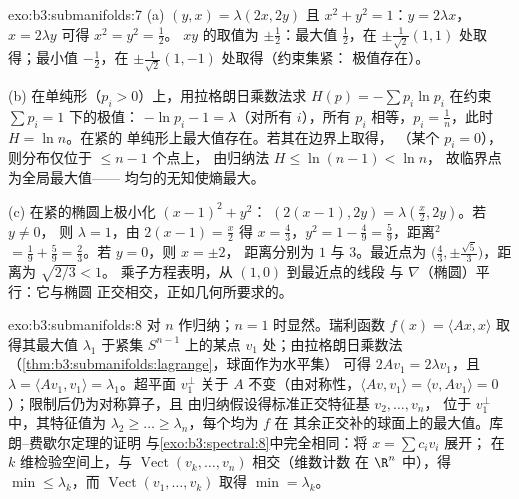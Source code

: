 \begin{solution}{exo:b3:submanifolds:7}
(a) $(y, x) = \lambda(2x, 2y)$ 且 $x^2 + y^2 = 1$：$y =
2\lambda x$，$x = 2\lambda y$ 可得 $x^2 = y^2 = \frac12$。
$xy$ 的取值为 $\pm\frac12$：最大值 $\frac12$，在
$\pm\frac1{\sqrt2}(1,1)$ 处取得；最小值 $-\frac12$，在
$\pm\frac1{\sqrt2}(1,-1)$ 处取得（约束集紧：
极值存在）。

(b) 在单纯形（$p_i > 0$）上，用拉格朗日乘数法求
$H(p) = -\sum p_i\ln p_i$ 在约束 $\sum p_i = 1$ 下的极值：
$-\ln p_i - 1 = \lambda$（对所有 $i$），所有 $p_i$ 相等，$p_i =
\frac1n$，此时 $H = \ln n$。在紧的
单纯形上最大值存在。若其在边界上取得，
（某个 $p_i = 0$），则分布仅位于 $\leq n - 1$ 个点上，
由归纳法 $H \leq \ln(n-1) < \ln n$，
故临界点为全局最大值——
均匀的无知使熵最大。

(c) 在紧的椭圆上极小化 $(x-1)^2 + y^2$：
$(2(x{-}1), 2y) = \lambda(\frac x2, 2y)$。若 $y \neq 0$，
则 $\lambda = 1$，由 $2(x - 1) = \frac x2$ 得 $x =
\frac43$，$y^2 = 1 - \frac49 = \frac59$，距离$^2$ $=
\frac19 + \frac59 = \frac23$。若 $y = 0$，则 $x = \pm2$，
距离分别为 $1$ 与 $3$。最近点为 $\bigl(\frac43,
\pm\frac{\sqrt5}3\bigr)$，距离为 $\sqrt{2/3} < 1$。
乘子方程表明，从 $(1,0)$ 到最近点的线段
与 $\nabla$（椭圆）平行：它与椭圆
正交相交，正如几何所要求的。
\end{solution}

\begin{solution}{exo:b3:submanifolds:8}
对 $n$ 作归纳；$n = 1$ 时显然。瑞利函数
$f(x) = \langle Ax, x\rangle$ 取得其最大值 $\lambda_1$
于紧集 $S^{n-1}$ 上的某点 $v_1$ 处；由拉格朗日乘数法
（\cref{thm:b3:submanifolds:lagrange}，球面作为水平集）
可得 $2Av_1 = 2\lambda v_1$，且 $\lambda = \langle Av_1,
v_1\rangle = \lambda_1$。超平面 $v_1^\perp$ 关于
$A$ 不变（由对称性，$\langle Av, v_1\rangle = \langle
v, Av_1\rangle = 0$）；限制后仍为对称算子，且
由归纳假设得标准正交特征基 $v_2, \dots, v_n$，
位于 $v_1^\perp$ 中，其特征值为 $\lambda_2 \geq \dots \geq
\lambda_n$，每个均为 $f$ 在
其余正交补的球面上的最大值。库朗–费歇尔定理的证明
与\cref{exo:b3:spectral:8}中完全相同：将 $x = \sum c_iv_i$ 展开；
在 $k$ 维检验空间上，与
$\operatorname{Vect}(v_k, \dots, v_n)$ 相交（维数计数
在 $\R^n$ 中），得 $\min \leq \lambda_k$，而
$\operatorname{Vect}(v_1, \dots, v_k)$ 取得 $\min =
\lambda_k$。
\end{solution}

